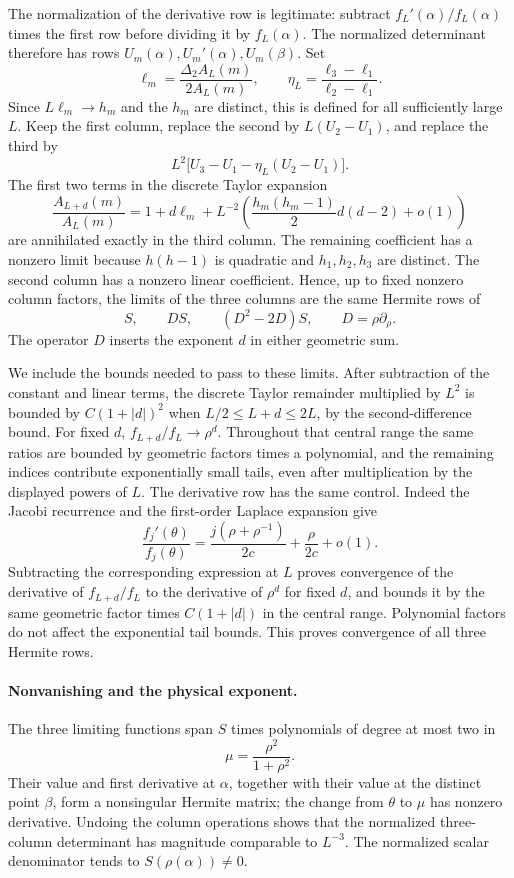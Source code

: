 \documentclass[11pt]{article}
\numberwithin{equation}{section}
\theoremstyle{definition}\newtheorem{definition}[theorem]{Definition}
\theoremstyle{remark}\newtheorem{remark}[theorem]{Remark}
\begin{document}
The normalization of the derivative row is legitimate: subtract
$f_L'(\alpha)/f_L(\alpha)$ times the first row before dividing it by
$f_L(\alpha)$. The normalized determinant therefore has rows
$U_m(\alpha),U_m'(\alpha),U_m(\beta)$. Set
\[
 \ell_m=\frac{\Delta_2 A_L(m)}{2A_L(m)},\qquad
 \eta_L=\frac{\ell_3-\ell_1}{\ell_2-\ell_1}.
\]
Since $L\ell_m\to h_m$ and the $h_m$ are distinct, this is defined
for all sufficiently large $L$. Keep the first column, replace the
second by $L(U_2-U_1)$, and replace the third by
\[
 L^2\big[U_3-U_1-\eta_L(U_2-U_1)\big].
\]
The first two terms in the discrete Taylor expansion
\[
 \frac{A_{L+d}(m)}{A_L(m)}
 =1+d\ell_m+
  L^{-2}\left(\frac{h_m(h_m-1)}2d(d-2)+o(1)\right)
\]
are annihilated exactly in the third column. The remaining coefficient
has a nonzero limit because $h(h-1)$ is quadratic and
$h_1,h_2,h_3$ are distinct. The second column has a nonzero linear
coefficient. Hence, up to fixed nonzero column factors, the limits of
the three columns are the same Hermite rows of
\[
 S,\qquad DS,\qquad(D^2-2D)S,\qquad D=\rho\partial_\rho.
\]
The operator $D$ inserts the exponent $d$ in either geometric sum.

We include the bounds needed to pass to these limits. After subtraction
of the constant and linear terms, the discrete Taylor remainder
multiplied by $L^2$ is bounded by $C(1+|d|)^2$ when
$L/2\le L+d\le2L$, by the second-difference bound. For fixed $d$,
$f_{L+d}/f_L\to\rho^d$. Throughout that central range the same
ratios are bounded by geometric factors times a polynomial, and the
remaining indices contribute exponentially small tails, even after
multiplication by the displayed powers of $L$.
The derivative row has the same control. Indeed the Jacobi recurrence
and the first-order Laplace expansion give
\[
 \frac{f_j'(\theta)}{f_j(\theta)}
 =\frac{j(\rho+\rho^{-1})}{2c}+\frac\rho{2c}+o(1).
\]
Subtracting the corresponding expression at $L$ proves convergence of
the derivative of $f_{L+d}/f_L$ to the derivative of $\rho^d$ for fixed
$d$, and bounds it by the same geometric factor times $C(1+|d|)$ in
the central range. Polynomial factors do not affect the exponential
tail bounds. This proves convergence of all three Hermite rows.

\paragraph{Nonvanishing and the physical exponent.}
The three limiting functions span $S$ times polynomials of degree at
most two in
\[
 \mu=\frac{\rho^2}{1+\rho^2}.
\]
Their value and first derivative at $\alpha$, together with their value
at the distinct point $\beta$, form a nonsingular Hermite matrix; the
change from $\theta$ to $\mu$ has nonzero derivative. Undoing the
column operations shows that the normalized three-column determinant
has magnitude comparable to $L^{-3}$. The normalized scalar denominator
tends to $S(\rho(\alpha))\ne0$.
\end{document}
